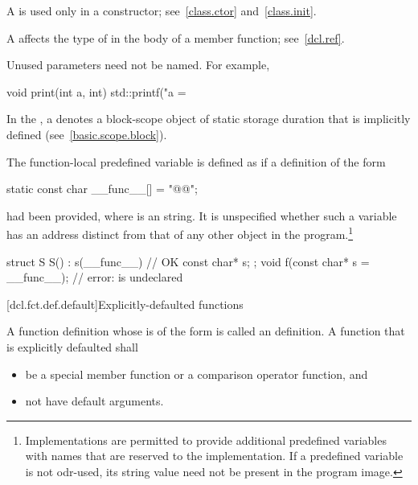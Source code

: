 \pnum
{}%
%
%
A
is used only in a constructor; see~\ref{class.ctor} and~\ref{class.init}.

\pnum
\begin{note}
A  affects the type of 
in the body of a member function; see~\ref{dcl.ref}.
\end{note}

\pnum
\begin{note}
Unused parameters need not be named.
For example,

\begin{codeblock}
void print(int a, int) {
  std::printf("a = %
}
\end{codeblock}
\end{note}

\pnum
In the , a
 denotes a block-scope object of static
storage duration that is implicitly defined (see~\ref{basic.scope.block}).

\pnum
The function-local predefined variable  is
defined as if a definition of the form
\begin{codeblock}
static const char __func__[] = "@@";
\end{codeblock}
had been provided, where  is an  string.
It is unspecified whether such a variable has an address
distinct from that of any other object in the program.\footnote{Implementations are
permitted to provide additional predefined variables with names that are reserved to the
implementation. If a predefined variable is not
odr-used, its string value need not be present in the program image.}
\begin{example}
\begin{codeblock}
struct S {
  S() : s(__func__) { }             // OK
  const char* s;
};
void f(const char* s = __func__);   // error:  is undeclared
\end{codeblock}
\end{example}

[dcl.fct.def.default]{Explicitly-defaulted functions}%

\pnum
A function definition whose
is of the form
is called an  definition.
A function that is explicitly defaulted shall
\begin{itemize}
\item be a special member function or
a comparison operator function, and
\item not have default arguments.
\end{itemize}

